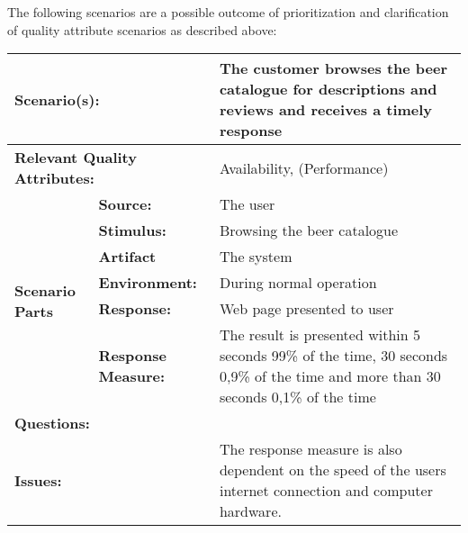 The following scenarios are a possible outcome of prioritization and clarification of quality attribute scenarios as described above:

\begin{table}[H]
\begin{center}
\begin{tabular}{|p{0.3cm}|p{2.5cm}|p{8cm}|}
  \hline
  \multicolumn{2}{|p{3cm}|}{\bfseries Scenario(s):} & The customer browses the beer catalogue for descriptions and reviews and receives a timely response \\
  \hline
  \multicolumn{2}{|p{3cm}|}{\bfseries Relevant Quality Attributes:} & Availability, (Performance) \\
  \hline
  \multirow{6}{*}{\begin{sideways}{\bfseries Scenario Parts}\end{sideways}}
  & {\bfseries Source:} & The user \\
  \cline{2-3}
  & {\bfseries Stimulus:} & Browsing the beer catalogue \\
  \cline{2-3}
  & {\bfseries Artifact} & The system \\
  \cline{2-3}
  & {\bfseries Environment:} & During normal operation \\
  \cline{2-3}
  & {\bfseries Response:} & Web page presented to user \\
  \cline{2-3}
  & {\bfseries Response Measure:} & The result is presented within 5 seconds 99\% of the time, 30 seconds 0,9\% of the time and more than 30 seconds 0,1\% of the time \\
  \hline
  \multicolumn{2}{|p{3cm}|}{\bfseries Questions:} & \\
  \hline
  \multicolumn{2}{|p{3cm}|}{\bfseries Issues:} & The response measure is also dependent on the speed of the users internet connection and computer hardware. \\
  \hline
\end{tabular}
\end{center}
\end{table}


